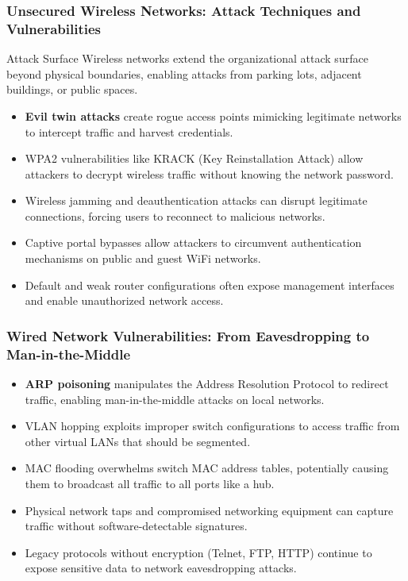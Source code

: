 \documentclass{beamer}
\begin{document}
\begin{frame}
    \frametitle{Unsecured Wireless Networks: Attack Techniques and Vulnerabilities}
    
    \begin{block}{Attack Surface}
        Wireless networks extend the organizational attack surface beyond physical boundaries, enabling attacks from parking lots, adjacent buildings, or public spaces.
    \end{block}
    
    \begin{itemize}
        \item \textbf{Evil twin attacks} create rogue access points mimicking legitimate networks to intercept traffic and harvest credentials.
        \item WPA2 vulnerabilities like KRACK (Key Reinstallation Attack) allow attackers to decrypt wireless traffic without knowing the network password.
        \item Wireless jamming and deauthentication attacks can disrupt legitimate connections, forcing users to reconnect to malicious networks.
        \item Captive portal bypasses allow attackers to circumvent authentication mechanisms on public and guest WiFi networks.
        \item Default and weak router configurations often expose management interfaces and enable unauthorized network access.
    \end{itemize}
\end{frame}

\begin{frame}
    \frametitle{Wired Network Vulnerabilities: From Eavesdropping to Man-in-the-Middle}
    
    \begin{itemize}
        \item \textbf{ARP poisoning} manipulates the Address Resolution Protocol to redirect traffic, enabling man-in-the-middle attacks on local networks.
        \item VLAN hopping exploits improper switch configurations to access traffic from other virtual LANs that should be segmented.
        \item MAC flooding overwhelms switch MAC address tables, potentially causing them to broadcast all traffic to all ports like a hub.
        \item Physical network taps and compromised networking equipment can capture traffic without software-detectable signatures.
        \item Legacy protocols without encryption (Telnet, FTP, HTTP) continue to expose sensitive data to network eavesdropping attacks.
    \end{itemize}
\end{frame}
\end{document}
